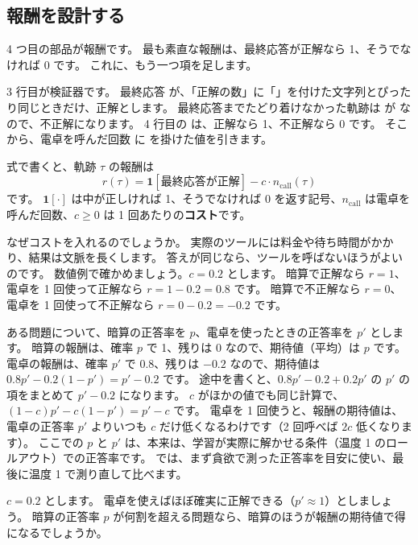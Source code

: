 \subsection{報酬を設計する}

4 つ目の部品が報酬です。
最も素直な報酬は、最終応答が正解なら 1、そうでなければ 0 です。
これに、もう一つ項を足します。


3 行目が検証器です。
最終応答  が、「正解の数」に「」を付けた文字列とぴったり同じときだけ、正解とします。
最終応答までたどり着けなかった軌跡は  が  なので、不正解になります。
4 行目の  は、正解なら 1、不正解なら 0 です。
そこから、電卓を呼んだ回数  に  を掛けた値を引きます。

式で書くと、軌跡 $\tau$ の報酬は
\begin{equation}
r(\tau)=\mathbf{1}[\text{最終応答が正解}]-c\cdot n_{\text{call}}(\tau)
\label{eq:arl-reward}
\end{equation}
です。
$\mathbf{1}[\cdot]$ は中が正しければ 1、そうでなければ 0 を返す記号、$n_{\text{call}}$ は電卓を呼んだ回数、$c\ge0$ は 1 回あたりの\textbf{コスト}です。

なぜコストを入れるのでしょうか。
実際のツールには料金や待ち時間がかかり、結果は文脈を長くします。
答えが同じなら、ツールを呼ばないほうがよいのです。
数値例で確かめましょう。$c=0.2$ とします。
暗算で正解なら $r=1$、電卓を 1 回使って正解なら $r=1-0.2=0.8$ です。
暗算で不正解なら $r=0$、電卓を 1 回使って不正解なら $r=0-0.2=-0.2$ です。

ある問題について、暗算の正答率を $p$、電卓を使ったときの正答率を $p'$ とします。
暗算の報酬は、確率 $p$ で 1、残りは 0 なので、期待値（平均）は $p$ です。
電卓の報酬は、確率 $p'$ で 0.8、残りは $-0.2$ なので、期待値は $0.8p'-0.2(1-p')=p'-0.2$ です。
途中を書くと、$0.8p'-0.2+0.2p'$ の $p'$ の項をまとめて $p'-0.2$ になります。
$c$ がほかの値でも同じ計算で、$(1-c)p'-c(1-p')=p'-c$ です。
電卓を 1 回使うと、報酬の期待値は、電卓の正答率 $p'$ よりいつも $c$ だけ低くなるわけです（2 回呼べば $2c$ 低くなります）。
ここでの $p$ と $p'$ は、本来は、学習が実際に解かせる条件（温度 1 のロールアウト）での正答率です。
では、まず貪欲で測った正答率を目安に使い、最後に温度 1 で測り直して比べます。

\begin{quiz}
$c=0.2$ とします。
電卓を使えばほぼ確実に正解できる（$p'\approx1$）としましょう。
暗算の正答率 $p$ が何割を超える問題なら、暗算のほうが報酬の期待値で得になるでしょうか。
\end{quiz}


